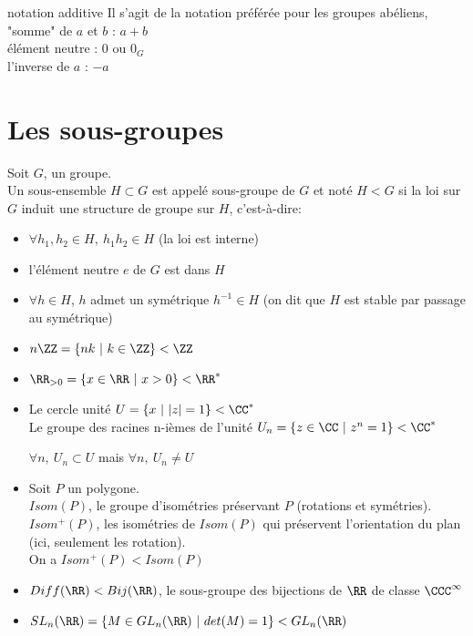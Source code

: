 \documentclass[../main.tex]{subfile}
\begin{document}
\begin{ex}
\begin{nota}{notation additive}
	Il s'agit de la notation préférée pour les groupes abéliens, \\
	"somme" de $a$ et $b$ : $a+b$\\
	élément neutre : $0$ ou $0_G$\\
	l'inverse de $a$ : $-a$
\end{nota}

\section{Les sous-groupes}
\begin{defi}
	Soit $G$, un groupe.\\
	Un sous-ensemble $H \subset G$ est appelé sous-groupe de $G$ et noté $H < G$ si la loi sur $G$ induit une structure de groupe sur $H$, c'est-à-dire:\\
\begin{itemize}	
	\item $\forall h_1, h_2 \in H, \ h_1h_2 \in H$ (la loi est interne)
	\item l'élément neutre $e$ de $G$ est dans $H$
	\item $\forall h \in H$, $h$ admet un symétrique $h^{-1} \in H$ (on dit que $H$ est stable par passage au symétrique)
\end{itemize}
\end{defi}

\begin{ex}
\begin{itemize}	
	\item $n \ZZ = \{nk \ |\ k \in \ZZ\} < \ZZ$
	\item $\RR_{> 0} = \{x \in \RR \ |\ x > 0\} < \RR^*$
	\item Le cercle unité $U = \{x \ | \ |z| = 1\} < \CC^*$\\
	Le groupe des racines n-ièmes de l'unité $U_n = \{z \in \CC \ | \ z^n = 1\} < \CC^*$
\begin{rema}	
	$\forall n, \ U_n \subset U$ mais $\forall n, \ U_n \neq U$
\end{rema}
	\item Soit $P$ un polygone.\\
	$Isom(P)$, le groupe d'isométries préservant $P$ (rotations et symétries).\\
	$Isom^+(P)$, les isométries de $Isom(P)$ qui préservent l'orientation du plan (ici, seulement les rotation).\\
	On a $Isom^+(P) < Isom(P)$
	\item $Diff(\RR) < Bij(\RR)$, le sous-groupe des bijections de $\RR$ de classe $\CCC^\infty$
	\item $SL_n(\RR) = \{M \in GL_n(\RR) \ |\ det(M) = 1\} < GL_n(\RR)$
\end{itemize}
\end{ex}


\end{ex}
\end{document}
